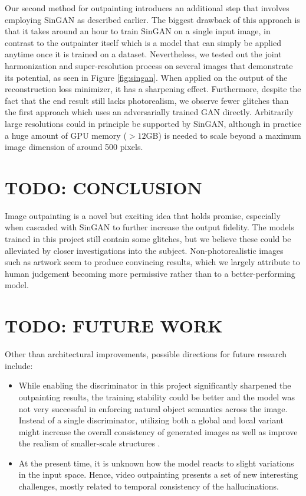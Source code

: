 \documentclass[twocolumn,showpacs,%
  nofootinbib,aps,superscriptaddress,%
  eqsecnum,prd,notitlepage,showkeys,10pt]{revtex4-1}
\begin{document}
\hspace{\parindent} Our second method for outpainting introduces an additional step that involves employing SinGAN as described earlier. The biggest drawback of this approach is that it takes around an hour to train SinGAN on a single input image, in contrast to the outpainter itself which is a model that can simply be applied anytime once it is trained on a dataset. Nevertheless, we tested out the joint harmonization and super-resolution process on several images that demonstrate its potential, as seen in Figure \ref{fig:singan}. When applied on the output of the reconstruction loss minimizer, it has a sharpening effect. Furthermore, despite the fact that the end result still lacks photorealism, we observe fewer glitches than the first approach which uses an adversarially trained GAN directly. Arbitrarily large resolutions could in principle be supported by SinGAN, although in practice a huge amount of GPU memory ($>12$GB) is needed to scale beyond a maximum image dimension of around 500 pixels.

\section{TODO: CONCLUSION}

\hspace{\parindent} Image outpainting is a novel but exciting idea that holds promise, especially when cascaded with SinGAN to further increase the output fidelity. The models trained in this project still contain some glitches, but we believe these could be alleviated by closer investigations into the subject. Non-photorealistic images such as artwork seem to produce convincing results, which we largely attribute to human judgement becoming more permissive rather than to a better-performing model.

\section{TODO: FUTURE WORK}

\hspace{\parindent}  Other than architectural improvements, possible directions for future research include:
\begin{itemize}
  \item While enabling the discriminator in this project significantly sharpened the outpainting results, the training stability could be better and the model was not very successful in enforcing natural object semantics across the image. Instead of a single discriminator, utilizing both a global and local variant might increase the overall consistency of generated images as well as improve the realism of smaller-scale structures \cite{Iizuka2017}.
  \item At the present time, it is unknown how the model reacts to slight variations in the input space. Hence, video outpainting presents a set of new interesting challenges, mostly related to temporal consistency of the hallucinations.
\end{itemize}
\end{document}

